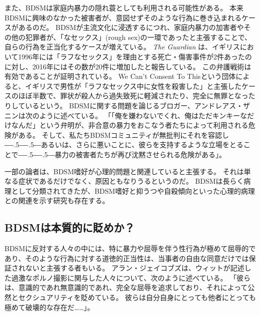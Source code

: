 \documentclass[paper=a4,book,openany]{jlreq}
\def\DDASH{―\kern-.5\zw―\kern-.5\zw―} %
\begin{document}
また、BDSMは家庭内暴力の隠れ蓑としても利用される可能性がある。
本来BDSMに興味のなかった被害者が、意図せずそのような行為に巻き込まれるケースがあるのだ。
BDSMが主流文化に浸透するにつれ、家庭内暴力の加害者やその他の犯罪者が、「なセックス」(rough sex)の一環であったと主張することで、自らの行為を正当化するケースが増えている。
\emph{The Guardian} は、イギリスにおいて1996年には「ラフなセックス」を理由とする死亡・傷害事件が2件あったのに対し、2016年にはその数が20件に増加したと報告している\citep{grierson20:_gover_consid_law_curb_use}。
この弁護戦術は有効であることが証明されている。
We Can't Consent To Thisという団体によると、イギリスで男性が「ラフなセックス中に女性を殺害した」と主張したケースのほぼ半数で、罪状が殺人から過失致死に軽減されたり、完全に無罪となったりしているという\citep{harman20:_rough_sex_gone_wrong_defen,woodyatt20:_grace_millan_rise_shades_defen_murder_trial}。
BDSMに関する問題を論じるブロガー、アンドレアス・ザニンは次のように述べている。
「「俺を嫌わないでくれ、俺はただキンキーなだけなんだ」という弁明が、非合意の暴力をおこなう者たちによって利用される危険がある。
そして、私たちBDSMコミュニティが無批判にそれを容認し{\DDASH}あるいは、さらに悪いことに、彼らを支持するような立場をとることで{\DDASH}暴力の被害者たちが再び沈黙させられる危険がある」\citep{zanin14:_poor_persec_perver}。

一部の論者は、BDSM嗜好が心理的問題と関連していると主張する。
それは単なる症状であるだけでなく、原因ともなりうるというのだ。
BDSMは長らく病理として分類されてきたが、BDSM嗜好と抑うつや自殺傾向といった心理的病理との関連を示す研究も存在する\citep{brown17:_suicid_risk_bdsm_pract}。

\subsection{BDSMは本質的に貶めか？}

BDSMに反対する人々の中には、特に暴力や屈辱を伴う性行為が極めて屈辱的であり、そのような行為に対する道徳的正当性は、当事者の自由な同意だけでは保証されないと主張する者もいる。
アラン・ジェイコブズは、ウィットが記述した過激なポルノ撮影に関与した人々について、次のように述べている。
「彼らは、意識的であれ無意識的であれ、完全な屈辱を追求しており、それによって公然とセクシュアリティを貶めている。
彼らは自分自身にとっても他者にとっても極めて破壊的な存在だ……」\citep{jacobs03:_in_which_noah_millm_i}。
\end{document}
